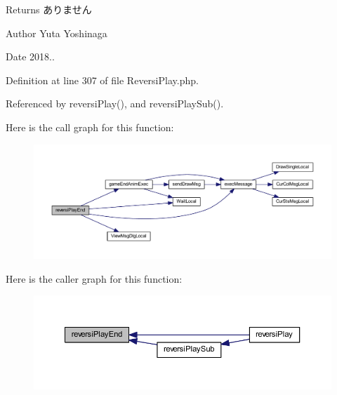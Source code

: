 \begin{DoxyReturn}{Returns}
ありません 
\end{DoxyReturn}
\begin{DoxyAuthor}{Author}
Yuta Yoshinaga 
\end{DoxyAuthor}
\begin{DoxyDate}{Date}
2018.. 
\end{DoxyDate}


Definition at line 307 of file Reversi\+Play.\+php.



Referenced by reversi\+Play(), and reversi\+Play\+Sub().

Here is the call graph for this function\+:\nopagebreak
\begin{figure}[H]
\begin{center}
\leavevmode
\includegraphics[width=350pt]{class_reversi_play_af55fe6b6f2005c7da80c696ed692783d_cgraph}
\end{center}
\end{figure}
Here is the caller graph for this function\+:\nopagebreak
\begin{figure}[H]
\begin{center}
\leavevmode
\includegraphics[width=350pt]{class_reversi_play_af55fe6b6f2005c7da80c696ed692783d_icgraph}
\end{center}
\end{figure}
\mbox{\label{class_reversi_play_a67816fe65a87e35d8e8cc35d5d269bcb}} 
